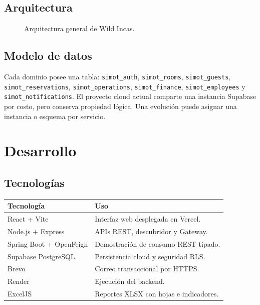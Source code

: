 \documentclass[12pt,a4paper]{article}
\begin{document}
\subsection{Arquitectura}

\begin{figure}[H]
\centering
{}
\caption{Arquitectura general de Wild Incas.}
\end{figure}

\subsection{Modelo de datos}

Cada dominio posee una tabla: \texttt{simot\_auth}, \texttt{simot\_rooms}, \texttt{simot\_guests}, \texttt{simot\_reservations}, \texttt{simot\_operations}, \texttt{simot\_finance}, \texttt{simot\_employees} y \texttt{simot\_notifications}. El proyecto cloud actual comparte una instancia Supabase por costo, pero conserva propiedad lógica. Una evolución puede asignar una instancia o esquema por servicio.

\section{Desarrollo}

\subsection{Tecnologías}

\begin{tabularx}{\textwidth}{lX}
\toprule
Tecnología & Uso \\
\midrule
React + Vite & Interfaz web desplegada en Vercel. \\
Node.js + Express & APIs REST, descubridor y Gateway. \\
Spring Boot + OpenFeign & Demostración de consumo REST tipado. \\
Supabase PostgreSQL & Persistencia cloud y seguridad RLS. \\
Brevo & Correo transaccional por HTTPS. \\
Render & Ejecución del backend. \\
ExcelJS & Reportes XLSX con hojas e indicadores. \\
\bottomrule
\end{tabularx}
\end{document}
